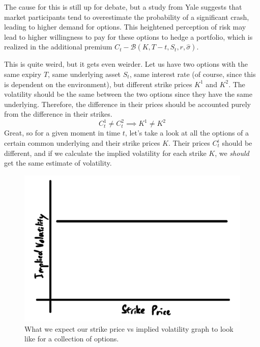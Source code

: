 \documentclass{article}
\begin{document}
    The cause for this is still up for debate, but a study from Yale suggests that market participants tend to overestimate the probability of a significant crash, leading to higher demand for options. This heightened perception of risk may lead to higher willingness to pay for these options to hedge a portfolio, which is realized in the additional premium $C_t - \mathcal{B}(K, T - t, S_t, r, \hat{\sigma})$. 

    This is quite weird, but it gets even weirder. Let us have two options with the same expiry $T$, same underlying asset $S_t$, same interest rate (of course, since this is dependent on the environment), but different strike prices $K^1$ and $K^2$. The volatility should be the same between the two options since they have the same underlying. Therefore, the difference in their prices should be accounted purely from the difference in their strikes. 
    \begin{equation}
      C_t^1 \neq C_t^2 \implies K^1 \neq K^2
    \end{equation}
    Great, so for a given moment in time $t$, let's take a look at all the options of a certain common underlying and their strike prices $K$. Their prices $C_t^i$ should be different, and if we calculate the implied volatility for each strike $K$, we \textit{should} get the same estimate of volatility. 

    \begin{figure}[H]
      \centering 
      \includegraphics[scale=0.4]{img/expected_vol_graph.png}
      \caption{What we expect our strike price vs implied volatility graph to look like for a collection of options. } 
      \label{fig:expected_volatility_graph}
    \end{figure}
\end{document}
